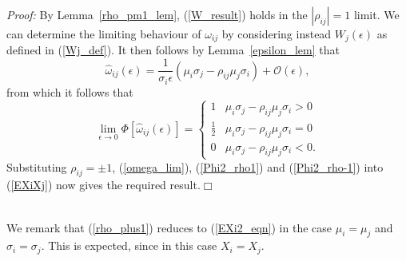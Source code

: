 \documentclass{article}
\newcommand{\ra}{\rightarrow}
\begin{document}
\noindent \textit{Proof:} By Lemma~\ref{rho_pm1_lem}, (\ref{W_result}) holds in the $|\rho_{ij}|=1$ limit. We can determine the limiting behaviour of $\omega_{ij}$ by considering instead $W_j(\epsilon)$ as defined in (\ref{Wj_def}). It then follows by Lemma~\ref{epsilon_lem} that 
$$\hat{\omega}_{ij}(\epsilon)=\frac{1}{\sigma_i\epsilon}(\mu_i\sigma_j-\rho_{ij}\mu_j\sigma_i)+\mathcal{O}(\epsilon),$$
from which it follows that
\begin{equation}\label{omega_lim}\lim_{\epsilon\ra 0}\Phi[\hat{\omega}_{ij}(\epsilon)]=\left\{\begin{array}{ll}1&\mu_i\sigma_j-\rho_{ij}\mu_j\sigma_i>0\\\frac{1}{2}&\mu_i\sigma_j-\rho_{ij}\mu_j\sigma_i=0\\0&\mu_i\sigma_j-\rho_{ij}\mu_j\sigma_i<0.\end{array}\right.\end{equation}
Substituting $\rho_{ij}=\pm 1$, (\ref{omega_lim}), (\ref{Phi2_rho1}) and (\ref{Phi2_rho-1}) into (\ref{EXiXj}) now gives the required result.\hfill$\Box$\\
$ $

We remark that (\ref{rho_plus1}) reduces to (\ref{EXi2_eqn}) in the case $\mu_i=\mu_j$ and $\sigma_i=\sigma_j$. This is expected, since in this case $X_i=X_j$.





\end{document}
